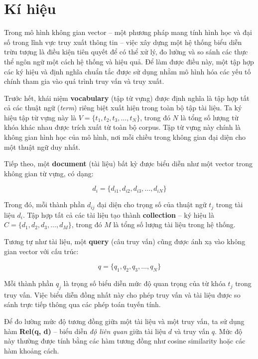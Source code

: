 \section{Kí hiệu}
Trong mô hình không gian vector -- một phương pháp mang tính hình học và đại số trong lĩnh vực truy xuất thông tin -- việc xây dựng một hệ thống biểu diễn trừu tượng là điều kiện tiên quyết để có thể xử lý, đo lường và so sánh các thực thể ngôn ngữ một cách hệ thống và hiệu quả. Để làm được điều này, một tập hợp các ký hiệu và định nghĩa chuẩn tắc được sử dụng nhằm mô hình hóa các yếu tố chính tham gia vào quá trình truy vấn và truy xuất.

Trước hết, khái niệm \textbf{vocabulary} (tập từ vựng) được định nghĩa là tập hợp tất cả các thuật ngữ (\textit{term}) riêng biệt xuất hiện trong toàn bộ tập tài liệu. Ta ký hiệu tập từ vựng này là \(V = \{t_1, t_2, t_3, \dots, t_N\}\), trong đó $N$ là tổng số lượng từ khóa khác nhau được trích xuất từ toàn bộ corpus. Tập từ vựng này chính là không gian hình học của mô hình, nơi mỗi chiều trong không gian đại diện cho một thuật ngữ duy nhất.

Tiếp theo, một \textbf{document} (tài liệu) bất kỳ được biểu diễn như một vector trong không gian từ vựng, có dạng:

\begin{equation}
    d_i = \{d_{i1}, d_{i2}, d_{i3}, \dots, d_{iN}\}
\end{equation}

Trong đó, mỗi thành phần \(d_{ij}\) đại diện cho trọng số của thuật ngữ \(t_j\) trong tài liệu \(d_i\). Tập hợp tất cả các tài liệu tạo thành \textbf{collection} -- ký hiệu là \(C = \{d_1, d_2, d_3, \dots, d_M\}\), trong đó \(M\) là tổng số lượng tài liệu trong hệ thống.

Tương tự như tài liệu, một \textbf{query} (câu truy vấn) cũng được ánh xạ vào không gian vector với cấu trúc:

\begin{equation}
    q = \{q_1, q_2, q_3, \dots, q_N\}
\end{equation}

Mỗi thành phần \(q_j\) là trọng số biểu diễn mức độ quan trọng của từ khóa \(t_j\) trong truy vấn. Việc biểu diễn đồng nhất này cho phép truy vấn và tài liệu được so sánh trực tiếp thông qua các phép toán tuyến tính.

Để đo lường mức độ tương đồng giữa một tài liệu và một truy vấn, ta sử dụng hàm \textbf{Rel(q, d)} -- biểu diễn \textit{độ liên quan} giữa tài liệu \(d\) và truy vấn \(q\). Mức độ này thường được tính bằng các hàm tương đồng như cosine similarity hoặc các hàm khoảng cách.

